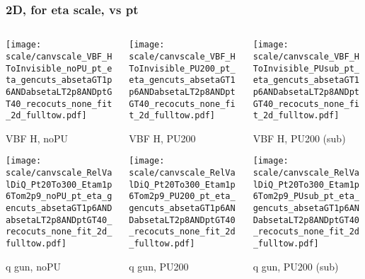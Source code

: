 \documentclass[8pt]{beamer}
\begin{document}
   \begin{frame}
  \frametitle{2D, for eta scale, vs pt}
  
  \begin{columns}
   \begin{column}{0.35\textwidth}
     \texttt{[image: scale/canvscale\_VBF\_HToInvisible\_noPU\_pt\_eta\_gencuts\_absetaGT1p6ANDabsetaLT2p8ANDptGT40\_recocuts\_none\_fit\_2d\_fulltow.pdf]}
     
     VBF H, noPU
    
     \texttt{[image: scale/canvscale\_RelValDiQ\_Pt20To300\_Etam1p6Tom2p9\_noPU\_pt\_eta\_gencuts\_absetaGT1p6ANDabsetaLT2p8ANDptGT40\_recocuts\_none\_fit\_2d\_fulltow.pdf]}
     
     q gun, noPU
   \end{column}
   \begin{column}{0.35\textwidth}
     \texttt{[image: scale/canvscale\_VBF\_HToInvisible\_PU200\_pt\_eta\_gencuts\_absetaGT1p6ANDabsetaLT2p8ANDptGT40\_recocuts\_none\_fit\_2d\_fulltow.pdf]}
     
     VBF H, PU200
    
     \texttt{[image: scale/canvscale\_RelValDiQ\_Pt20To300\_Etam1p6Tom2p9\_PU200\_pt\_eta\_gencuts\_absetaGT1p6ANDabsetaLT2p8ANDptGT40\_recocuts\_none\_fit\_2d\_fulltow.pdf]}
     
     q gun, PU200
   \end{column}
   \begin{column}{0.35\textwidth}
     \texttt{[image: scale/canvscale\_VBF\_HToInvisible\_PUsub\_pt\_eta\_gencuts\_absetaGT1p6ANDabsetaLT2p8ANDptGT40\_recocuts\_none\_fit\_2d\_fulltow.pdf]}
     
     VBF H, PU200 (sub)
    
     \texttt{[image: scale/canvscale\_RelValDiQ\_Pt20To300\_Etam1p6Tom2p9\_PUsub\_pt\_eta\_gencuts\_absetaGT1p6ANDabsetaLT2p8ANDptGT40\_recocuts\_none\_fit\_2d\_fulltow.pdf]}
     
     q gun, PU200 (sub)
   \end{column}
  \end{columns}
 \end{frame}
 
\end{document}
